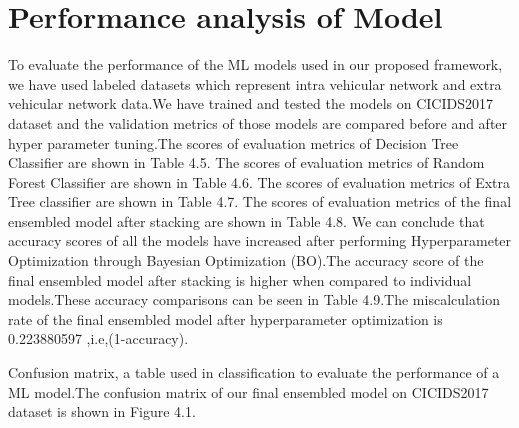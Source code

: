 \pagebreak
\section{Performance analysis of Model}
To evaluate the performance of the ML models used in our proposed framework, we have used labeled datasets which represent intra vehicular network and extra vehicular network data.We have trained and tested the models on CICIDS2017 dataset and the validation metrics of those models are compared before and after hyper parameter tuning.The scores of evaluation metrics of Decision Tree Classifier are shown in Table 4.5.
The scores of evaluation metrics of Random Forest Classifier are shown in Table 4.6.
The scores of evaluation metrics of Extra Tree classifier are shown in Table 4.7. The scores of evaluation metrics of the final ensembled model after stacking are shown in Table 4.8.
We can conclude that accuracy scores of all the models have increased after performing Hyperparameter Optimization through Bayesian Optimization (BO).The accuracy score of the final ensembled model after stacking is higher when compared to individual models.These accuracy comparisons can be seen in Table 4.9.The miscalculation rate of the final ensembled model after hyperparameter optimization is 0.223880597 ,i.e,(1-accuracy).

\par Confusion matrix, a table used in classification to evaluate the performance of a ML model.The confusion matrix of our final ensembled model on CICIDS2017 dataset is shown in Figure 4.1.


